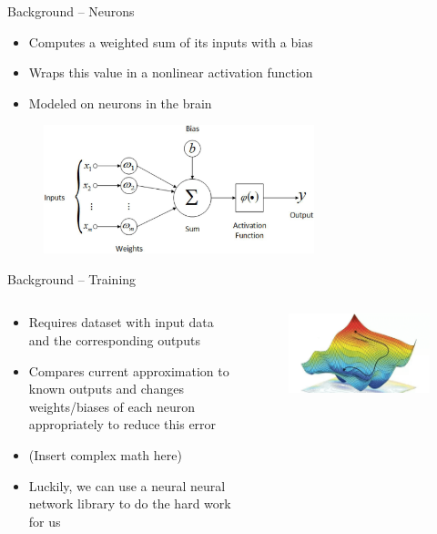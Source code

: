\documentclass{beamer}
\begin{document}
	\begin{frame}{Background -- Neurons}
	\begin{itemize}
		\item Computes a weighted sum of its inputs with a bias
		\item Wraps this value in a nonlinear activation function
		\item Modeled on neurons in the brain
	\end{itemize}
	\begin{figure}
		\includegraphics[width=0.7\textwidth]{neuron}
	\end{figure}
	\end{frame}

	\begin{frame}{Background -- Training}
	\begin{columns}
	\begin{column}{0.5\textwidth}
	\begin{itemize}
		\item Requires dataset with input data and the corresponding outputs
		\item Compares current approximation to known outputs and changes weights/biases of each neuron appropriately to reduce this error
		\item (Insert complex math here)
		\item Luckily, we can use a neural neural network library to do the hard work for us
	\end{itemize}
	\end{column}
	\begin{column}{0.5\textwidth}
	\begin{figure}
		\includegraphics[width=\textwidth]{gradient_descent}
	\end{figure}
	\end{column}
	\end{columns}
	\end{frame}
\end{document}
